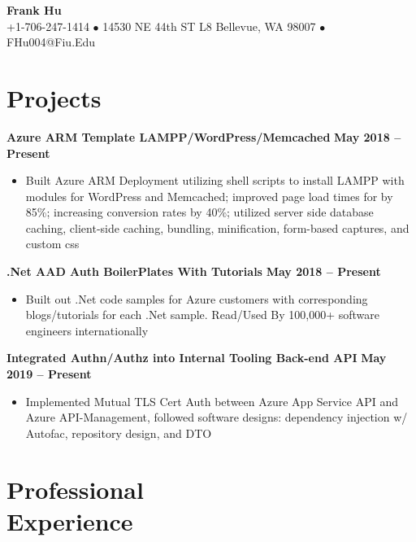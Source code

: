 \documentclass[margin,line]{resume}
\begin{document}
	{\centering \LARGE{\textbf{Frank Hu}}}
	\\
	\normalsize
	+1-706-247-1414 $\bullet$ 14530 NE 44th ST L8 Bellevue, WA 98007 $\bullet$ FHu004@Fiu.Edu
	
	\begin{resume}	
		
	
	\section{\mysidestyle Projects}
	
	\textbf{Azure ARM Template LAMPP/WordPress/Memcached}  \hfill \textbf{May 2018 -- Present}
	\vspace{1mm}
	\begin{itemize}
		\item Built Azure ARM Deployment utilizing shell scripts to install LAMPP with modules for WordPress and Memcached; improved page load times for by 85\%; increasing conversion rates by 40\%; utilized server side database caching, client-side caching, bundling, minification, form-based captures, and custom css
	\end{itemize}

	\textbf{.Net AAD Auth BoilerPlates With Tutorials}  \hfill \textbf{May 2018 -- Present}
	\vspace{1mm}
	\begin{itemize}
		\item Built out .Net code samples for Azure customers with corresponding blogs/tutorials for each .Net sample. Read/Used By 100,000+ software engineers internationally
	\end{itemize}
	
	\textbf{Integrated Authn/Authz into Internal Tooling Back-end API}  \hfill \textbf{May 2019 -- Present}
	\vspace{1mm}
	\begin{itemize}
		\item Implemented Mutual TLS Cert Auth between Azure App Service API and Azure API-Management, followed software designs: dependency injection w/ Autofac, repository design, and DTO
	\end{itemize}
		
	\section{\mysidestyle Professional\\Experience}
	

\end{resume}
\end{document}
